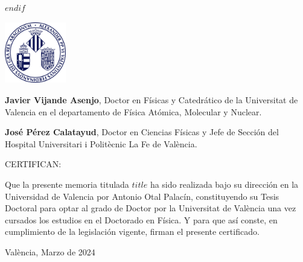 \raggedright
$endif$


\newpage
\thispagestyle{empty}
\begin{flushright}
\end{flushright}


\includegraphics[width=0.2\textwidth]{logouni} %

\vspace{4ex}

\justify

\textbf{Javier Vijande Asenjo}, Doctor en Físicas y Catedrático de la Universitat de Valencia en el departamento de Física Atómica, Molecular y Nuclear.

\vspace{3ex}

\justify

\textbf{José Pérez Calatayud}, Doctor en Ciencias Físicas y Jefe de Sección del Hospital Universitari i Politècnic La Fe de València.

\vspace{5ex}

{\Large CERTIFICAN: }

\vspace{3ex}

\justify

Que la presente memoria titulada \emph{$title$} ha
sido realizada bajo su dirección en la Universidad de Valencia por Antonio Otal Palacín, constituyendo su Tesis Doctoral para optar al grado de Doctor por la
Universitat de València una vez cursados los estudios en el Doctorado en Física. Y para
que así conste, en cumplimiento de la legislación vigente, firman el presente certificado.

\vspace{3ex}

\justify

València, Marzo de 2024

\vspace{25ex}

